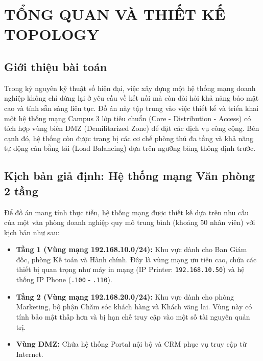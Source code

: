 \section{TỔNG QUAN VÀ THIẾT KẾ TOPOLOGY}

\subsection{Giới thiệu bài toán}
Trong kỷ nguyên kỹ thuật số hiện đại, việc xây dựng một hệ thống mạng doanh nghiệp không chỉ dừng lại ở yêu cầu về kết nối mà còn đòi hỏi khả năng bảo mật cao và tính sẵn sàng liên tục. Đồ án này tập trung vào việc thiết kế và triển khai một hệ thống mạng Campus 3 lớp tiêu chuẩn (Core - Distribution - Access) có tích hợp vùng biên DMZ (Demilitarized Zone) để đặt các dịch vụ công cộng. Bên cạnh đó, hệ thống còn được trang bị các cơ chế phòng thủ đa tầng và khả năng tự động cân bằng tải (Load Balancing) dựa trên ngưỡng băng thông định trước.

\subsection{Kịch bản giả định: Hệ thống mạng Văn phòng 2 tầng}
Để đồ án mang tính thực tiễn, hệ thống mạng được thiết kế dựa trên nhu cầu của một văn phòng doanh nghiệp quy mô trung bình (khoảng 50 nhân viên) với kịch bản như sau:
\begin{itemize}
    \item \textbf{Tầng 1 (Vùng mạng 192.168.10.0/24):} Khu vực dành cho Ban Giám đốc, phòng Kế toán và Hành chính. Đây là vùng mạng ưu tiên cao, chứa các thiết bị quan trọng như máy in mạng (IP Printer: \texttt{192.168.10.50}) và hệ thống IP Phone (\texttt{.100} - \texttt{.110}).
    \item \textbf{Tầng 2 (Vùng mạng 192.168.20.0/24):} Khu vực dành cho phòng Marketing, bộ phận Chăm sóc khách hàng và Khách vãng lai. Vùng này có tính bảo mật thấp hơn và bị hạn chế truy cập vào một số tài nguyên quản trị.
    \item \textbf{Vùng DMZ:} Chứa hệ thống Portal nội bộ và CRM phục vụ truy cập từ Internet.
\end{itemize}

